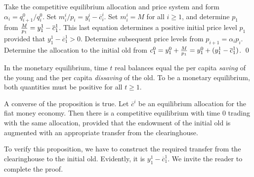 \medskip
{}  Take the competitive equilibrium allocation
and  price system and form $ \alpha_i = q^0_{i+1}/q^0_i$.  Set
$m_i^i/p_i = y_i^i - \overline c_i^i$. Set $m_i^i = M$ for all $i \geq 1$,
and   determine $p_1$ from ${M \over p_1} = y_1^1  - \overline c_1^1$.
This last equation determines a positive initial price level
$p_1$ provided that $y_1^1 - \overline c_1^1 >0$.  Determine
subsequent price levels from $p_{i+1} = \alpha_i p_i$.
Determine the allocation to the initial old from
$c^0_1 = y^0_1 + {M \over p_1} = y^0_1 +(y_1^1 - \overline c_1^1)$.  \qed

\medskip
In the monetary equilibrium, time $t$ real balances
equal the per capita {\it saving\/} of the young and the
per capita {\it dissaving\/} of the old. To be a monetary equilibrium, both quantities must
be positive for all $t \geq 1$.


A converse of the proposition is true.
\medskip
{}  Let    $\overline c^i$ be an
equilibrium allocation for the fiat money economy.    Then
there is a competitive equilibrium with time $0$ trading
with the same allocation, provided that the endowment
of the initial old is augmented with an appropriate  transfer
from the clearinghouse.
\medskip

To  verify this proposition, we have to construct
the required transfer from the clearinghouse to the initial
old.  Evidently, it is $y^1_1 - \overline c^1_1$.  We invite
the reader to complete  the proof.









